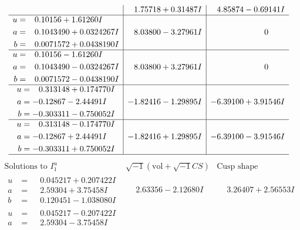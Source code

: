 \documentclass[1p]{elsarticle_modified}
\theoremstyle{definition}
\newcommand{\I}{\sqrt{-1}}
\begin{document}
$$\begin{array}{c|c|c}
 & \phantom{-}1.75718 + 0.31487 I & \phantom{-}4.85874 - 0.69141 I \\ \hline\begin{aligned}
u &= \phantom{-}0.10156 + 1.61260 I \\
a &= \phantom{-}0.1043490 + 0.0324267 I \\
b &= \phantom{-}0.0071572 + 0.0438190 I\end{aligned}
 & \phantom{-}8.03800 - 3.27961 I & \phantom{-0.000000 } 0 \\ \hline\begin{aligned}
u &= \phantom{-}0.10156 - 1.61260 I \\
a &= \phantom{-}0.1043490 - 0.0324267 I \\
b &= \phantom{-}0.0071572 - 0.0438190 I\end{aligned}
 & \phantom{-}8.03800 + 3.27961 I & \phantom{-0.000000 } 0 \\ \hline\begin{aligned}
u &= \phantom{-}0.313148 + 0.174770 I \\
a &= -0.12867 - 2.44491 I \\
b &= -0.303311 - 0.750052 I\end{aligned}
 & -1.82416 - 1.29895 I & -6.39100 + 3.91546 I \\ \hline\begin{aligned}
u &= \phantom{-}0.313148 - 0.174770 I \\
a &= -0.12867 + 2.44491 I \\
b &= -0.303311 + 0.750052 I\end{aligned}
 & -1.82416 + 1.29895 I & -6.39100 - 3.91546 I\\
 \hline 
 \end{array}$$\newpage$$\begin{array}{c|c|c}  
\text{Solutions to }I^u_{1}& \I (\text{vol} + \sqrt{-1}CS) & \text{Cusp shape}\\
 \hline 
\begin{aligned}
u &= \phantom{-}0.045217 + 0.207422 I \\
a &= \phantom{-}2.59304 + 3.75458 I \\
b &= \phantom{-}0.120451 - 1.038080 I\end{aligned}
 & \phantom{-}2.63356 - 2.12680 I & \phantom{-}3.26407 + 2.56553 I \\ \hline\begin{aligned}
u &= \phantom{-}0.045217 - 0.207422 I \\
a &= \phantom{-}2.59304 - 3.75458 I \\

\end{aligned}
\end{array}$$
\end{document}
